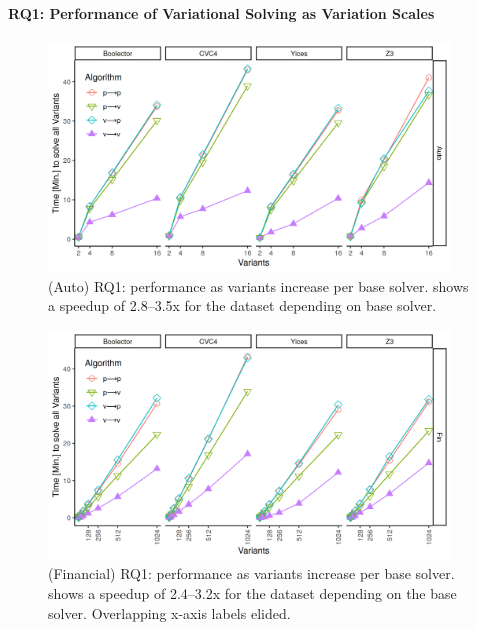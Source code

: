 \paragraph{RQ1: Performance of Variational Solving as Variation Scales}

\begin{figure}
  \centering
  \includegraphics[width=0.95\textwidth]{Plots/RQ1_Auto}
  \caption{(Auto) RQ1: performance as variants increase per base solver. \vTov{}
    shows a speedup of 2.8--3.5x for the \auto{} dataset depending on base
    solver.}%
  \label{res:rq1:auto}
\end{figure}
%
\begin{figure}
  \centering
  \includegraphics[width=0.95\textwidth]{Plots/RQ1_Fin}
  \caption{(Financial) RQ1: performance as variants increase per base solver. \vTov{}
    shows a speedup of 2.4--3.2x for the \fin{} dataset depending on the base
    solver. Overlapping x-axis labels elided.}%
  \label{res:rq1:fin}
\end{figure}

